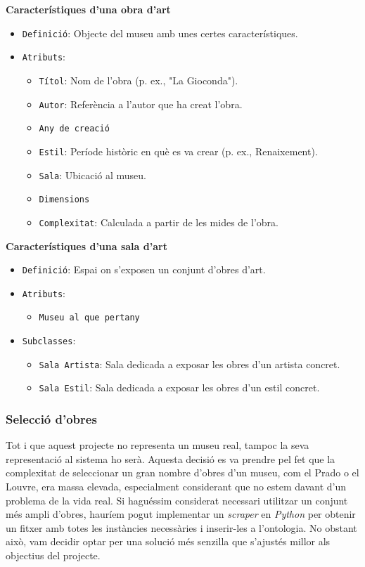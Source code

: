 \documentclass[a4paper]{article}
\begin{document}
	
	\noindent \textbf{Característiques d'una obra d'art}
	\begin{itemize}
		\item \texttt{Definició}: Objecte del museu amb unes certes característiques.
		\item \texttt{Atributs}:
			\begin{itemize}
				\item \texttt{Títol}: Nom de l’obra (p. ex., "La Gioconda").
				\item \texttt{Autor}: Referència a l’autor que ha creat l'obra.
				\item \texttt{Any de creació}
				\item \texttt{Estil}: Període històric en què es va crear (p. ex., Renaixement).
				\item \texttt{Sala}: Ubicació al museu.
				\item \texttt{Dimensions}
				\item \texttt{Complexitat}: Calculada a partir de les mides de l'obra.
			\end{itemize}
	\end{itemize}


	\noindent \textbf{Característiques d'una sala d'art}
	\begin{itemize}
		\item \texttt{Definició}: Espai on s'exposen un conjunt d'obres d'art.
		\item \texttt{Atributs}:
		\begin{itemize}
			\item \texttt{Museu al que pertany}
		\end{itemize}
		\item \texttt{Subclasses}:
		\begin{itemize}
			\item \texttt{Sala Artista}: Sala dedicada a exposar les obres d'un artista concret.
			\item \texttt{Sala Estil}: Sala dedicada a exposar les obres d'un estil concret.
		\end{itemize}
	\end{itemize}
	
	\subsubsection{Selecció d'obres}
	
	Tot i que aquest projecte no representa un museu real, tampoc la seva representació al sistema ho serà. Aquesta decisió es va prendre pel fet que la complexitat de seleccionar un gran nombre d'obres d'un museu, com el Prado o el Louvre, era massa elevada, especialment considerant que no estem davant d'un problema de la vida real. Si haguéssim considerat necessari utilitzar un conjunt més ampli d'obres, hauríem pogut implementar un \textit{scraper} en \textit{Python} per obtenir un fitxer amb totes les instàncies necessàries i inserir-les a l'ontologia. No obstant això, vam decidir optar per una solució més senzilla que s'ajustés millor als objectius del projecte.\\
	
\end{document}
